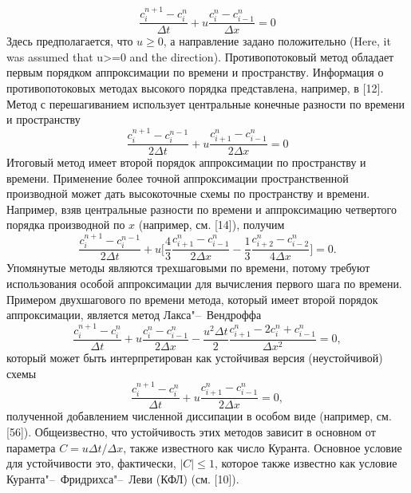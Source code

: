 %
\begin{equation}
\label{eq:equation2_3}
\frac{c_i^{n+1}-c_i^n}{\Delta t} + u\frac{c_i^n-c_{i-1}^{n}}{\Delta x} = 0
\end{equation}
%
Здесь предполагается, что $u\ge0$, а направление задано положительно (Here, it was assumed that u>=0 and the direction). Противопотоковый метод обладает первым порядком аппроксимации по времени и пространству. Информация о противопотоковых методах высокого порядка представлена, например, в [12]. Метод с перешагиванием использует центральные конечные разности по времени и пространству
%
\begin{equation}
\label{eq:equation2_4}
\frac{c_i^{n+1}-c_i^{n-1}}{2\Delta t} + u\frac{c_{i+1}^n-c_{i-1}^{n}}{2\Delta x} = 0
\end{equation}
%
Итоговый метод имеет второй порядок аппроксимации по пространству и времени. Применение более точной аппроксимации пространственной производной может дать высокоточные схемы по пространству и времени. Например, взяв центральные разности по времени и аппроксимацию четвертого порядка производной по $x$ (например, см. [14]), получим
%
\begin{equation}
\label{eq:equation2_5}
\frac{c_i^{n+1}-c_i^{n-1}}{2\Delta t} + u\Big[\frac{4}{3}\frac{c_{i+1}^n-c_{i-1}^n}{2\Delta x}-\frac{1}{3}\frac{c_{i+2}^n-c_{i-2}^n}{4\Delta x}\Big] = 0.
\end{equation}
%
Упомянутые методы являются трехшаговыми по времени, потому требуют использования особой аппроксимации для вычисления первого шага по времени. Примером двухшагового по времени метода, который имеет второй порядок аппроксимации, является метод Лакса"--~Вендроффа
%
\begin{equation}
\label{eq:equation2_6}
\frac{c_i^{n+1}-c_i^n}{\Delta t} + u\frac{c_i^n-c_{i-1}^n}{2\Delta x} - \frac{u^2\Delta t}{2}\frac{c_{i+1}^n-2c_i^n+c_{i-1}^n}{\Delta x^2} = 0,
\end{equation}
%
который может быть  интерпретирован как устойчивая версия (неустойчивой) схемы
%
\begin{equation}
\label{eq:equation2_7}
\frac{c_i^{n+1}-c_i^n}{\Delta t} + u\frac{c_{i+1}^n-c_{i-1}^n}{2\Delta x} = 0,
\end{equation}
%
полученной добавлением численной диссипации в особом виде (например, см. [56]). Общеизвестно, что устойчивость этих методов зависит в основном от параметра $C=u\Delta t/\Delta x$, также известного как число Куранта. Основное условие для устойчивости это, фактически, $\left|C\right|\le1$, которое также известно как условие Куранта"--~Фридрихса"--~Леви (КФЛ) (см. [10]).

